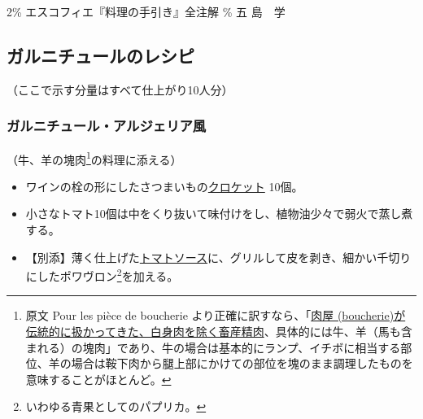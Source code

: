2\% エスコフィエ『料理の手引き』全注解 \% 五 島　学

\hypertarget{garnitures-recettes}{%
\subsection{ガルニチュールのレシピ}\label{garnitures-recettes}}


\begin{center}
\medlarge（ここで示す分量はすべて仕上がり10人分）
\end{center}
\normalsize

\begin{recette}

\hypertarget{garniture-algerienne}{%
\subsubsection{ガルニチュール・アルジェリア風}\label{garniture-algerienne}}



（牛、羊の塊肉\footnote{原文 Pour les pièce de boucherie
  より正確に訳すなら、「\ul{肉屋
  (boucherie)が伝統的に扱かってきた、白身肉を除く畜産精肉}、具体的には牛、羊（馬も含まれる）の塊肉」であり、牛の場合は基本的にランプ、イチボに相当する部位、羊の場合は鞍下肉から腿上部にかけての部位を塊のまま調理したものを意味することがほとんど。}の料理に添える）

\begin{itemize}
\item
  ワインの栓の形にしたさつまいもの\protect\hyperlink{croquettes}{クロケット}
  10個。
\item
  小さなトマト10個は中をくり抜いて味付けをし、植物油少々で弱火で蒸し煮する。
\item
  【別添】薄く仕上げた\protect\hyperlink{sauce-tomate}{トマトソース}に、グリルして皮を剥き、細かい千切りにしたポワヴロン\footnote{いわゆる青果としてのパプリカ。}を加える。
\end{itemize}

\atoaki{}


\end{recette}
